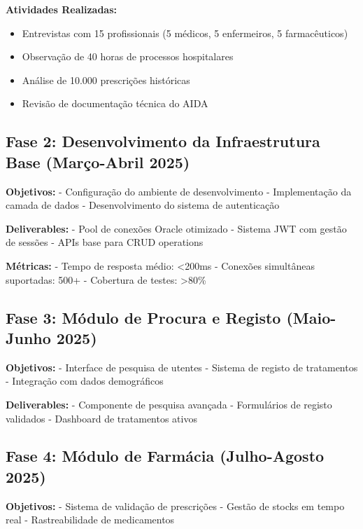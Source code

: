 
\textbf{Atividades Realizadas:}
\begin{itemize}
    \item Entrevistas com 15 profissionais (5 médicos, 5 enfermeiros, 5 farmacêuticos)
    \item Observação de 40 horas de processos hospitalares
    \item Análise de 10.000 prescrições históricas
    \item Revisão de documentação técnica do AIDA
\end{itemize}

\subsection{Fase 2: Desenvolvimento da Infraestrutura Base (Março-Abril 2025)}

\textbf{Objetivos:}
- Configuração do ambiente de desenvolvimento
- Implementação da camada de dados
- Desenvolvimento do sistema de autenticação

\textbf{Deliverables:}
- Pool de conexões Oracle otimizado
- Sistema JWT com gestão de sessões
- APIs base para CRUD operations

\textbf{Métricas:}
- Tempo de resposta médio: <200ms
- Conexões simultâneas suportadas: 500+
- Cobertura de testes: >80\%

\subsection{Fase 3: Módulo de Procura e Registo (Maio-Junho 2025)}

\textbf{Objetivos:}
- Interface de pesquisa de utentes
- Sistema de registo de tratamentos
- Integração com dados demográficos


\textbf{Deliverables:}
- Componente de pesquisa avançada
- Formulários de registo validados
- Dashboard de tratamentos ativos

\subsection{Fase 4: Módulo de Farmácia (Julho-Agosto 2025)}

\textbf{Objetivos:}
- Sistema de validação de prescrições
- Gestão de stocks em tempo real
- Rastreabilidade de medicamentos

